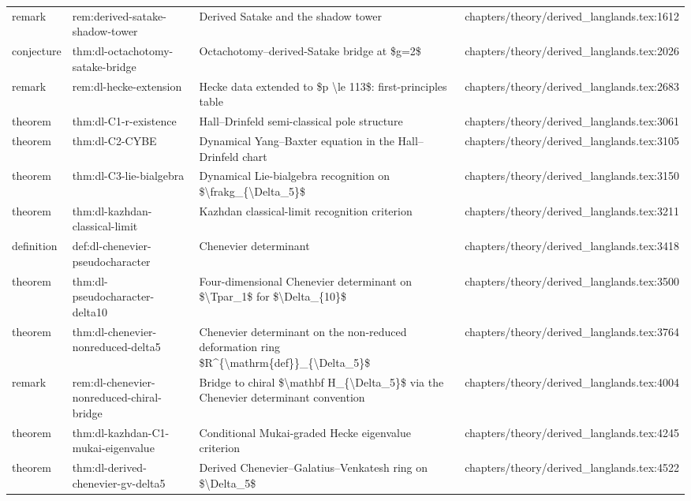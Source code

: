 \documentclass[11pt]{article}
\begin{document}
\begin{longtable}{L{0.10\textwidth}L{0.26\textwidth}L{0.42\textwidth}L{0.22\textwidth}}
remark & rem:derived-satake-shadow-tower & Derived Satake and the shadow tower & chapters/theory/derived\_langlands.tex:1612\\
conjecture & thm:dl-octachotomy-satake-bridge & Octachotomy--derived-Satake bridge at \$g=2\$ & chapters/theory/derived\_langlands.tex:2026\\
remark & rem:dl-hecke-extension & Hecke data extended to \$p \textbackslash{}le 113\$: first-principles table & chapters/theory/derived\_langlands.tex:2683\\
theorem & thm:dl-C1-r-existence & Hall--Drinfeld semi-classical pole structure & chapters/theory/derived\_langlands.tex:3061\\
theorem & thm:dl-C2-CYBE & Dynamical Yang--Baxter equation in the Hall--Drinfeld chart & chapters/theory/derived\_langlands.tex:3105\\
theorem & thm:dl-C3-lie-bialgebra & Dynamical Lie-bialgebra recognition on \$\textbackslash{}frakg\_\{\textbackslash{}Delta\_5\}\$ & chapters/theory/derived\_langlands.tex:3150\\
theorem & thm:dl-kazhdan-classical-limit & Kazhdan classical-limit recognition criterion & chapters/theory/derived\_langlands.tex:3211\\
definition & def:dl-chenevier-pseudocharacter & Chenevier determinant & chapters/theory/derived\_langlands.tex:3418\\
theorem & thm:dl-pseudocharacter-delta10 & Four-dimensional Chenevier determinant on \$\textbackslash{}Tpar\_1\$ for \$\textbackslash{}Delta\_\{10\}\$ & chapters/theory/derived\_langlands.tex:3500\\
theorem & thm:dl-chenevier-nonreduced-delta5 & Chenevier determinant on the non-reduced deformation ring \$R\textasciicircum{}\{\textbackslash{}mathrm\{def\}\}\_\{\textbackslash{}Delta\_5\}\$ & chapters/theory/derived\_langlands.tex:3764\\
remark & rem:dl-chenevier-nonreduced-chiral-bridge & Bridge to chiral \$\textbackslash{}mathbf H\_\{\textbackslash{}Delta\_5\}\$ via the Chenevier determinant convention & chapters/theory/derived\_langlands.tex:4004\\
theorem & thm:dl-kazhdan-C1-mukai-eigenvalue & Cond{}itional Mukai-graded Hecke eigenvalue criterion & chapters/theory/derived\_langlands.tex:4245\\
theorem & thm:dl-derived-chenevier-gv-delta5 & Derived Chenevier--Galatius--Venkatesh ring on \$\textbackslash{}Delta\_5\$ & chapters/theory/derived\_langlands.tex:4522\\

\end{longtable}
\end{document}
